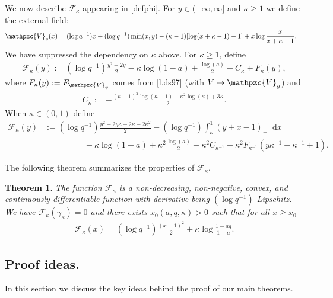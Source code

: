\documentclass[reqno,11pt]{amsart}
\newcommand{\lln}{\gamma_\kappa}
\numberwithin{equation}{section}
\newtheorem{theorem}[proposition]{Theorem}
\theoremstyle{definition}
\newcommand*\diff{\mathop{}\!\mathrm{d}}
\begin{document}
We now describe $\mathcal{F}_\kappa$ appearing in \eqref{defphi}. For $y\in (-\infty,\infty]$ and $\kappa\ge 1$ we define the external field:
\begin{equation}\label{def.vs}
\begin{aligned}
    \mathpzc{V}_y(x) & =(\log a^{-1}) x+(\log q^{-1})\min(x,y) -(\kappa-1)[\log(x+\kappa-1)-1]+x\log \frac{x}{x+\kappa-1}.
\end{aligned}
\end{equation}
 We have suppressed the dependency on $\kappa$ above. For $\kappa\ge 1$, define
\begin{align}
    \label{def:fs}
     \mathcal{F}_\kappa(y):=(\log q^{-1})\frac{y^2-2y}{2}-\kappa\log (1-a)+\frac{\log(a)}{2}+C_{\kappa}+F_\kappa(y),
\end{align}
where $F_\kappa(y):=F_{\mathpzc{V}_y}$ comes from \eqref{l.ds97} (with $V\mapsto \mathpzc{V}_y$) and 
\begin{align}\label{def.ca}
    C_{\kappa}:=-\frac{(\kappa -1)^2 \log (\kappa -1) -\kappa^2  \log (\kappa )+3\kappa}{2}.
\end{align}
When $\kappa\in (0,1)$ define
\begin{equation}\label{def:fs2}
   \begin{aligned}
    \mathcal{F}_\kappa(y) & :=(\log q^{-1})\frac{y^2-2y\kappa+2\kappa-2\kappa^2}{2}-(\log q^{-1})\int_{\kappa}^1 (y+x-1)_+\diff x \\ & \hspace{2cm}-\kappa\log (1-a)+\kappa^2\frac{\log(a)}{2}+\kappa^2C_{\kappa^{-1}}+\kappa^2 F_{\kappa^{-1}}(y\kappa^{-1}-\kappa^{-1}+1).
\end{aligned} 
\end{equation}


The following theorem summarizes the properties of $\mathcal{F}_\kappa$.


\begin{theorem}\label{thm.main2} The function $\mathcal{F}_\kappa$ is a non-decreasing, non-negative, convex, and continuously differentiable function with derivative being $(\log q^{-1})$-Lipschitz. We have $\mathcal{F}_\kappa(\lln)=0$ and there exists $x_0(a,q,\kappa)>0$ such that for all $x\ge x_0$
\begin{align}\label{parab}
    \mathcal{F}_\kappa(x)=(\log q^{-1})\frac{(x-1)^2}{2}+\kappa \log \frac{1-aq}{1-a}.
\end{align}
\end{theorem}

\subsection{Proof ideas.} \label{sec:pfidea} In this section we discuss the key ideas behind the proof of our main theorems.
\end{document}
